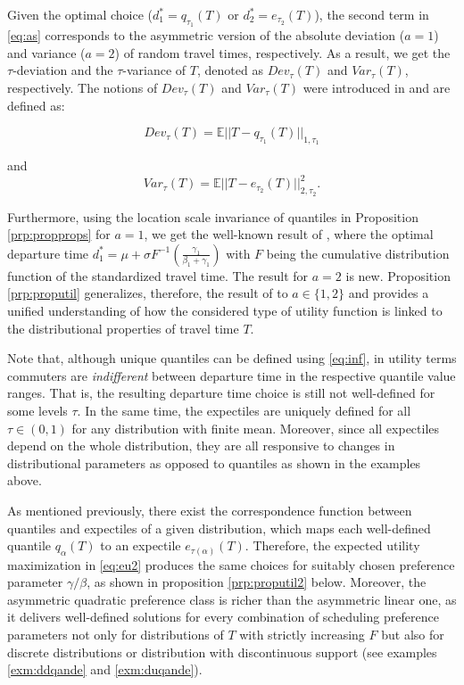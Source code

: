 \documentclass[preprint, 3p, authoryear]{elsarticle} %
\theoremstyle{definition}
\theoremstyle{definition}
\theoremstyle{definition}
\theoremstyle{definition}
\theoremstyle{remark}
\begin{document}
Given the optimal choice (\(d_1^*= q_{\tau_1}(T)\) or \(d_2^*= e_{\tau_2}(T)\)), the second term in \eqref{eq:as} corresponds to the asymmetric version of the absolute deviation (\(a=1\)) and variance (\(a=2\)) of random travel times, respectively. As a result, we get the \(\tau\)-deviation and the \(\tau\)-variance of \(T\), denoted as \(Dev_\tau(T)\) and \(Var_\tau(T)\), respectively. The notions of \(Dev_\tau(T)\) and \(Var_\tau(T)\) were introduced in \citet{tran2019} and are defined as:

\begin{equation}
Dev_\tau(T) = \mathbb E ||T-q_{\tau_1}(T)||_{1,\tau_1} \label{eq:tdev}
\end{equation}

and
\begin{equation}
Var_\tau(T) = \mathbb E ||T-e_{\tau_2}(T)||^2_{2,\tau_2}. \label{eq:tvar}
\end{equation}

Furthermore, using the location scale invariance of quantiles in Proposition \ref{prp:propprops} for \(a=1\), we get the well-known result of \citet{fosgerau2010}, where the optimal departure time \(d_1^* = \mu + \sigma F^{-1}\left(\frac{\gamma_1}{\beta_1+\gamma_1}\right)\) with \(F\) being the cumulative distribution function of the standardized travel time. The result for \(a=2\) is new. Proposition \ref{prp:proputil} generalizes, therefore, the result of \citet{fosgerau2010} to \(a\in\{1,2\}\) and provides a unified understanding of how the considered type of utility function is linked to the distributional properties of travel time \(T\).

Note that, although unique quantiles can be defined using \eqref{eq:inf}, in utility terms commuters are \emph{indifferent} between departure time in the respective quantile value ranges. That is, the resulting departure time choice is still not well-defined for some levels \(\tau\). In the same time, the expectiles are uniquely defined for all \(\tau\in (0,1)\) for any distribution with finite mean. Moreover, since all expectiles depend on the whole distribution, they are all responsive to changes in distributional parameters as opposed to quantiles as shown in the examples above.

As mentioned previously, there exist the correspondence function between quantiles and expectiles of a given distribution, which maps each well-defined quantile \(q_{\alpha}(T)\) to an expectile \(e_{\tau(\alpha)}(T)\). Therefore, the expected utility maximization in \eqref{eq:eu2} produces the same choices for suitably chosen preference parameter \(\gamma/\beta\), as shown in proposition \ref{prp:proputil2} below. Moreover, the asymmetric quadratic preference class is richer than the asymmetric linear one, as it delivers well-defined solutions for every combination of scheduling preference parameters not only for distributions of \(T\) with strictly increasing \(F\) but also for discrete distributions or distribution with discontinuous support (see examples \ref{exm:ddqande} and \ref{exm:duqande}).
\end{document}
